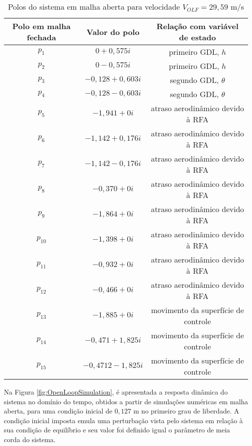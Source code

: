\begin{table}[h]
\centering
\caption{Polos do sistema em malha aberta para velocidade $V_{OLF} = 29,59$ m/s}
\begin{tabular}{ccc} 
Polo em malha fechada & Valor do polo & Relação com variável de estado \\ \hline
$p_{1} $  & $0+0,575i$ & primeiro \gls{GDL}, $h$                                \\
$p_{2} $  & $0-0,575i$ & primeiro \gls{GDL}, $h$                                \\
$p_{3} $  & $-0,128+0,603i$ & segundo \gls{GDL}, $\theta$                       \\
$p_{4} $  & $-0,128-0,603i$ & segundo \gls{GDL}, $\theta$                       \\
$p_{5} $  & $-1,941+0i$ &  atraso aerodinâmico devido à \gls{RFA}          \\
$p_{6} $  & $-1,142+0,176i$ & atraso aerodinâmico devido à \gls{RFA}       \\
$p_{7} $  & $-1,142-0,176i$ & atraso aerodinâmico devido à \gls{RFA}       \\
$p_{8} $  & $-0,370+0i$ & atraso aerodinâmico devido à \gls{RFA}           \\
$p_{9} $  & $-1,864+0i$ & atraso aerodinâmico devido à \gls{RFA}           \\
$p_{10} $ & $-1,398+0i$ & atraso aerodinâmico devido à \gls{RFA}           \\
$p_{11} $ & $-0,932+0i$ & atraso aerodinâmico devido à \gls{RFA}           \\
$p_{12} $ & $-0,466+0i$ & atraso aerodinâmico devido à \gls{RFA}           \\
$p_{13} $ & $-1,885+0i$ & movimento da superfície de controle                   \\
$p_{14} $ & $-0,471+1,825i$ & movimento da superfície de controle               \\
$p_{15} $ & $-0,4712-1,825i$ & movimento da superfície de controle              \\
\hline
\end{tabular}
\label{tab:VOLF-Poles}
\end{table}

\newpage

Na Figura \ref{fig:OpenLoopSimulation}, é apresentada a resposta dinâmica do sistema no domínio do tempo, obtidos a partir de simulações numéricas em malha aberta, para uma condição inicial de $0,127$ m no primeiro grau de liberdade. A condição inicial imposta emula uma perturbação vista pelo sistema em relação à sua condição de equilíbrio e seu valor foi definido igual o parâmetro de meia corda do sistema.

